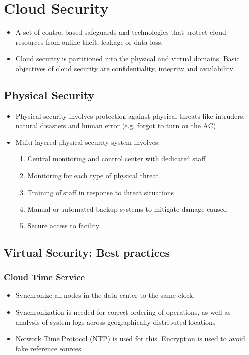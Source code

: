 \documentclass{article}
\begin{document}
\section{Cloud Security}
\begin{itemize}
    \item A set of control-based safeguards and technologies that protect cloud resources from online theft, leakage or data loss. 
    
    \item Cloud security is partitioned into the physical and virtual domains. Basic objectives of cloud security are confidentiality, integrity and availability
\end{itemize}

\subsection{Physical Security}
\begin{itemize}
    \item Physical security involves protection against physical threats like intruders, natural disasters and human error (e.g. forgot to turn on the AC)
    
    \item Multi-layered physical security system involves:
    \begin{enumerate}
        \item Central monitoring and control center with dedicated staff
        
        \item Monitoring for each type of physical threat
        
        \item Training of staff in response to threat situations
        
        \item Manual or automated backup systems to mitigate damage caused
        
        \item Secure access to facility
    \end{enumerate}
\end{itemize}

\subsection{Virtual Security: Best practices}
\subsubsection{Cloud Time Service}
\begin{itemize}
    \item Synchronize all nodes in the data center to the same clock. 
    
    \item Synchronization is needed for correct ordering of operations, as well as analysis of system logs across geographically distributed locations
    
    \item Network Time Protocol (NTP) is used for this. Encryption is used to avoid fake reference sources. 
\end{itemize}
\end{document}
